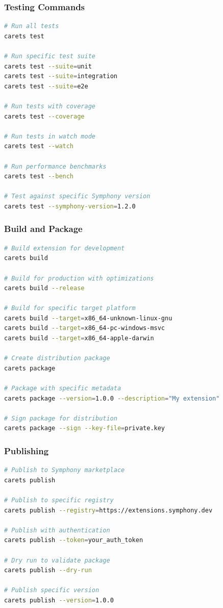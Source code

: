 \subsubsection*{Testing Commands}

\begin{lstlisting}[language=bash,caption={Extension Testing}]
# Run all tests
carets test

# Run specific test suite
carets test --suite=unit
carets test --suite=integration
carets test --suite=e2e

# Run tests with coverage
carets test --coverage

# Run tests in watch mode
carets test --watch

# Run performance benchmarks
carets test --bench

# Test against specific Symphony version
carets test --symphony-version=1.2.0
\end{lstlisting}

\subsubsection*{Build and Package}

\begin{lstlisting}[language=bash,caption={Build and Packaging}]
# Build extension for development
carets build

# Build for production with optimizations
carets build --release

# Build for specific target platform
carets build --target=x86_64-unknown-linux-gnu
carets build --target=x86_64-pc-windows-msvc
carets build --target=x86_64-apple-darwin

# Create distribution package
carets package

# Package with specific metadata
carets package --version=1.0.0 --description="My extension"

# Sign package for distribution
carets package --sign --key-file=private.key
\end{lstlisting}

\subsubsection*{Publishing}

\begin{lstlisting}[language=bash,caption={Extension Publishing}]
# Publish to Symphony marketplace
carets publish

# Publish to specific registry
carets publish --registry=https://extensions.symphony.dev

# Publish with authentication
carets publish --token=your_auth_token

# Dry run to validate package
carets publish --dry-run

# Publish specific version
carets publish --version=1.0.0
\end{lstlisting}

